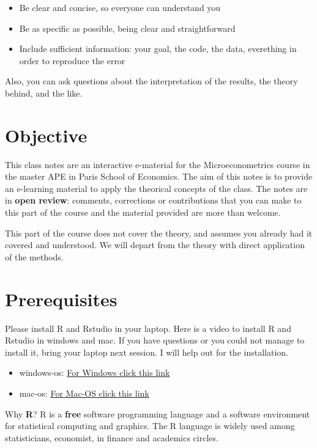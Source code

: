 \documentclass[]{book}
\providecommand{\tightlist}{%
  \setlength{\itemsep}{0pt}\setlength{\parskip}{0pt}}
\begin{document}
\begin{itemize}
\tightlist
\item
  Be clear and concise, so everyone can understand you
\item
  Be as specific as possible, being clear and straightforward
\item
  Include sufficient information: your goal, the code, the data,
  everething in order to reproduce the error
\end{itemize}

Also, you can ask questions about the interpretation of the results, the
theory behind, and the like.

\section{Objective}\label{objective}

This class notes are an interactive e-material for the Microeconometrics
course in the master APE in Paris School of Economics. The aim of this
notes is to provide an e-learning material to apply the theorical
concepts of the class. The notes are in \textbf{open review}: comments,
corrections or contributions that you can make to this part of the
course and the material provided are more than welcome.

This part of the course does not cover the theory, and assumes you
already had it covered and understood. We will depart from the theory
with direct application of the methods.

\section{Prerequisites}\label{prerequisites}

Please install R and Rstudio in your laptop. Here is a video to install
R and Rstudio in windows and mac. If you have questions or you could not
manage to install it, bring your laptop next session. I will help out
for the installation.

\begin{itemize}
\tightlist
\item
  windows-os: \href{https://www.youtube.com/watch?v=9-RrkJQQYqY}{For
  Windows click this link}
\item
  mac-os: \href{https://www.youtube.com/watch?v=GLLZhc_5enQ}{For Mac-OS
  click this link}
\end{itemize}

Why \textbf{R}? R is a \textbf{free} software programming language and a
software environment for statistical computing and graphics. The R
language is widely used among statisticians, economist, in finance and
academics circles.
\end{document}
